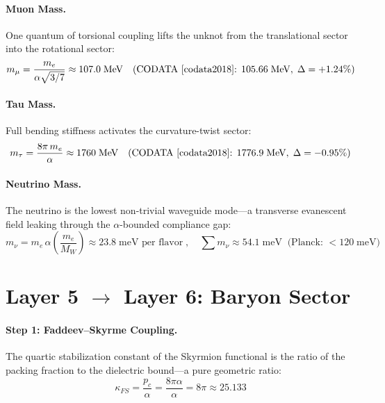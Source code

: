 \paragraph{Muon Mass.}
One quantum of torsional coupling lifts the unknot from the translational
sector into the rotational sector:
\begin{equation}
    m_\mu = \frac{m_e}{\alpha\sqrt{3/7}}
    \approx 107.0\;\text{MeV}
    \quad\text{(CODATA~\cite{codata2018}: } 105.66\;\text{MeV},\; \Delta = +1.24\%\text{)}
    \label{eq:muon}
\end{equation}

\paragraph{Tau Mass.}
Full bending stiffness activates the curvature-twist sector:
\begin{equation}
    m_\tau = \frac{8\pi\,m_e}{\alpha}
    \approx 1760\;\text{MeV}
    \quad\text{(CODATA~\cite{codata2018}: } 1776.9\;\text{MeV},\; \Delta = -0.95\%\text{)}
    \label{eq:tau}
\end{equation}

\paragraph{Neutrino Mass.}
The neutrino is the lowest non-trivial waveguide mode---a transverse
evanescent field leaking through the $\alpha$-bounded compliance gap:
\begin{equation}
    m_\nu = m_e\,\alpha\!\left(\frac{m_e}{M_W}\right)
    \approx 23.8\;\text{meV per flavor}
    \;,\quad
    \sum m_\nu \approx 54.1\;\text{meV}
    \;\;\text{(Planck: } < 120\;\text{meV)}
    \label{eq:neutrino}
\end{equation}

\section{Layer 5 $\to$ Layer 6: Baryon Sector}
\label{sec:layer56}

\paragraph{Step 1: Faddeev--Skyrme Coupling.}
The quartic stabilization constant of the Skyrmion functional is the ratio of
the packing fraction to the dielectric bound---a pure geometric ratio:
\begin{equation}
    \kappa_{FS} = \frac{p_c}{\alpha} = \frac{8\pi\alpha}{\alpha}
    = \boxed{8\pi}
    \approx 25.133
    \label{eq:kappa_FS}
\end{equation}

